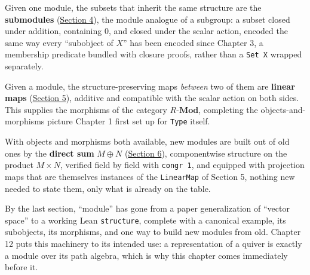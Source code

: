 Given one module, the subsets that inherit the same structure are the \textbf{submodules} (\hyperref[sec:11-modules:04-submodules:1]{Section 4}), the module analogue of a subgroup: a subset closed under addition, containing \(0\), and closed under the scalar action, encoded the same way every ``subobject of \(X\)'' has been encoded since Chapter 3, a membership predicate bundled with closure proofs, rather than a \texttt{Set X} wrapped separately.

Given a module, the structure-preserving maps \emph{between} two of them are \textbf{linear maps} (\hyperref[sec:11-modules:05-linear-maps:1]{Section 5}), additive and compatible with the scalar action on both sides. This supplies the morphisms of the category \(R\text{-}\mathbf{Mod}\), completing the objects-and-morphisms picture Chapter 1 first set up for \texttt{Type} itself.

With objects and morphisms both available, new modules are built out of old ones by the \textbf{direct sum} \(M \oplus N\) (\hyperref[sec:11-modules:06-direct-sums:1]{Section 6}), componentwise structure on the product \(M \times N\), verified field by field with \texttt{congr 1}, and equipped with projection maps that are themselves instances of the \texttt{LinearMap} of Section 5, nothing new needed to state them, only what is already on the table.

By the last section, ``module'' has gone from a paper generalization of ``vector space'' to a working Lean \texttt{structure}, complete with a canonical example, its subobjects, its morphisms, and one way to build new modules from old. Chapter 12 puts this machinery to its intended use: a representation of a quiver is exactly a module over its path algebra, which is why this chapter comes immediately before it.









